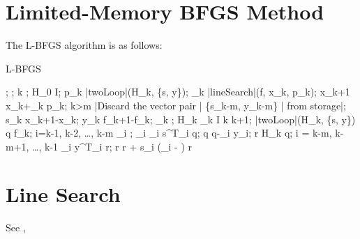 \section{Limited-Memory BFGS Method}\label{sec:LBFGS}
The L-BFGS algorithm is as follows:

\begin{algorithm}
    \mbox{L-BFGS}
    \begin{program}
        \BEGIN
        ;
        ;
        k ;
        H_0 \leftarrow I;
        \WHILE \NOT{} \DO
        p_k \leftarrow |twoLoop|(H_k, \{s, y\});
        \alpha_k \leftarrow |lineSearch|(f, x_k, p_k); 
        x_{k+1} \leftarrow x_k+\alpha_k p_k;
        \IF k>m
        \THEN
            |Discard the vector pair | \{s_{k-m}, y_{k-m}\} | from storage|;
        \FI
        s_k \leftarrow x_{k+1}-x_k;
        y_k \leftarrow \nabla f_{k+1}-\nabla f_k;
        \gamma_k \leftarrow {};
        H_k \leftarrow \gamma_k I
        k \leftarrow k+1;
        \OD
        \WHERE
        \FUNCT |twoLoop|(H_k, \{s, y\}) \BODY
            \EXP q \leftarrow \nabla f_k;
            \FOR i=k-1, k-2, \ldots, k-m \DO
            \rho_i \leftarrow {};
            \alpha_i \leftarrow \rho_i s^T_i q;
            q \leftarrow q-\alpha_i y_i;
            \OD
            r \leftarrow H_k q;
            \FOR i = k-m, k-m+1, \ldots, k-1 \DO
            \beta \leftarrow \rho_i y^T_i r;
            r \leftarrow r + s_i (\alpha_i - \beta)
            \OD
            r \ENDEXP \ENDFUNCT
        \END
    \end{program}
\end{algorithm}

\section{Line Search}\label{sec:LineSearch}
See \cite{Nocedal2006}, \cite{MoreThuente1992}

